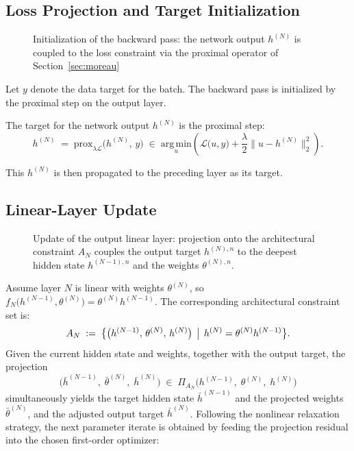 \documentclass{article}
\begin{document}
\subsection{Loss Projection and Target Initialization}
 
\begin{figure}[htbp]
\centering
\resizebox{\textwidth}{!}{%

}
\caption{Initialization of the backward pass: the network output $h^{(N)}$ is coupled to
the loss constraint via the proximal operator of Section~\ref{sec:moreau}}
\end{figure}

Let $y$ denote the data target for the batch. The backward pass is initialized by the proximal step on the output layer.

The target for the network output $h^{(N)}$ is the proximal step:
\begin{equation}
\label{eq:proximal-step}
h^{(N)} \;=\; \mathrm{prox}_{\lambda \mathcal{L}}\!\bigl(h^{(N)},\, y\bigr) \;\in\; \underset{u}{\mathrm{arg\,min}} \left( \mathcal{L}\bigl(u, y\bigr) + \frac{\lambda}{2} \bigl\|u - h^{(N)}\bigr\|_2^2 \right).
\end{equation}

This $h^{(N)}$ is then propagated to the preceding layer as its target.

 
\subsection{Linear-Layer Update}
\begin{figure}[htbp]
\centering
\resizebox{\textwidth}{!}{%

}
\caption{Update of the output linear layer: projection onto the architectural constraint
$A_{N}$ couples the output target ${h}^{(N),n}$ to the deepest hidden state
$h^{(N-1),n}$ and the weights $\theta^{(N),n}$.}
\label{fig:next_back_prop}
\end{figure}

Assume layer $N$ is linear with weights $\theta^{(N)}$, so $f_N\bigl(h^{(N-1)},\theta^{(N)}\bigr) = \theta^{(N)} h^{(N-1)}$. The corresponding architectural constraint set is:
\begin{equation}
A_{N} \;:=\; \bigl\{\bigl(h^{(N-1)},\, \theta^{(N)},\, h^{(N)}\bigr) \,\bigm|\, h^{(N)} = \theta^{(N)} h^{(N-1)} \bigr\}.
\end{equation}
Given the current hidden state and weights, together with the output target, the projection
\begin{equation}
\bigl(\bar{h}^{(N-1)},\; \bar{\theta}^{(N)},\; \bar{h}^{(N)}\bigr) \;\in\; \Pi_{A_{N}}\!\bigl(h^{(N-1)},\; \theta^{(N)},\; h^{(N)}\bigr)
\end{equation}
simultaneously yields the target hidden state $\bar{h}^{(N-1)}$ and the projected weights $\bar{\theta}^{(N)}$, and the adjusted output target $\bar{h}^{(N)}$. Following the nonlinear relaxation strategy, the next parameter iterate is obtained by feeding the projection residual into the chosen first-order optimizer:
\end{document}
